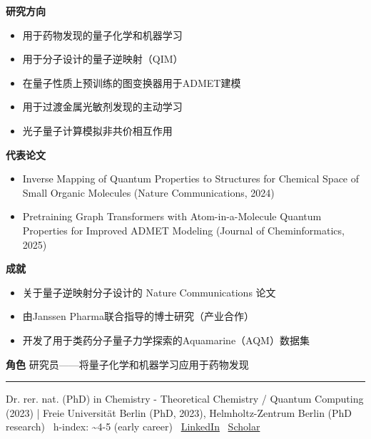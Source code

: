 \par{\footnotesize\color{mainred}\textbf{研究方向}}
\begin{itemize}[leftmargin=1.2em,itemsep=0pt,topsep=0pt]
\item {\footnotesize 用于药物发现的量子化学和机器学习}
\item {\footnotesize 用于分子设计的量子逆映射（QIM）}
\item {\footnotesize 在量子性质上预训练的图变换器用于ADMET建模}
\item {\footnotesize 用于过渡金属光敏剂发现的主动学习}
\item {\footnotesize 光子量子计算模拟非共价相互作用}
\end{itemize}
\par{\footnotesize\color{mainred}\textbf{代表论文}}
\begin{itemize}[leftmargin=1.2em,itemsep=0pt,topsep=0pt]
\item {\footnotesize Inverse Mapping of Quantum Properties to Structures for Chemical Space of Small Organic Molecules (Nature Communications, 2024)}
\item {\footnotesize Pretraining Graph Transformers with Atom-in-a-Molecule Quantum Properties for Improved ADMET Modeling (Journal of Cheminformatics, 2025)}
\end{itemize}
\par{\footnotesize\color{mainred}\textbf{成就}}
\begin{itemize}[leftmargin=1.2em,itemsep=0pt,topsep=0pt]
\item {\footnotesize 关于量子逆映射分子设计的 Nature Communications 论文}
\item {\footnotesize 由Janssen Pharma联合指导的博士研究（产业合作）}
\item {\footnotesize 开发了用于类药分子量子力学探索的Aquamarine（AQM）数据集}
\end{itemize}
\par{\footnotesize\color{mainred}\textbf{角色}} {\footnotesize 研究员——将量子化学和机器学习应用于药物发现}
\vspace{2pt}\hrule\vspace{2pt}
\vspace{4pt}
\par{\footnotesize\color{graytext}Dr. rer. nat. (PhD) in Chemistry - Theoretical Chemistry / Quantum Computing (2023) | Freie Universität Berlin (PhD, 2023), Helmholtz-Zentrum Berlin (PhD research) \textbar\  h-index: \textasciitilde{}4-5 (early career) \textbar\  \href{https://www.linkedin.com/in/fabian-langkabel-728bba275/}{LinkedIn} \textbar\  \href{Not publicly found; indexed via Semantic Scholar and arXiv}{Scholar}}
